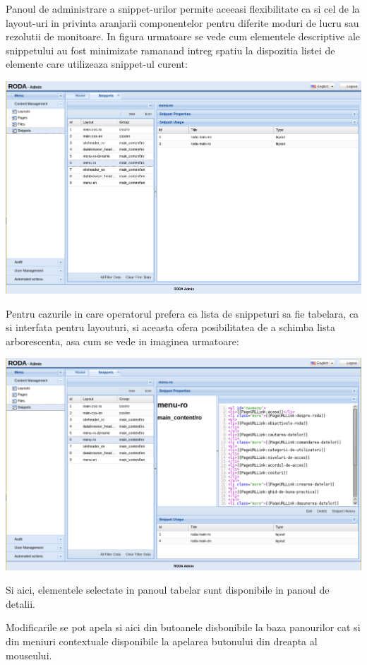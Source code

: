 Panoul de administrare a snippet-urilor permite aceeasi flexibilitate
ca si cel de la layout-uri in privinta aranjarii componentelor pentru
diferite moduri de lucru sau rezolutii de monitoare. In figura urmatoare
se vede cum elementele descriptive ale snippetului au fost minimizate
ramanand intreg spatiu la dispozitia listei de elemente care utilizeaza
snippet-ul curent:

\includegraphics[width=15cm]{cms/backend/snippet/snippet5}

Pentru cazurile in care operatorul prefera ca lista de snippeturi
sa fie tabelara, ca si interfata pentru layouturi, si aceasta ofera
posibilitatea de a schimba lista arborescenta, asa cum se vede in
imaginea urmatoare:

\includegraphics[width=15cm]{cms/backend/snippet/snippet6}

Si aici, elementele selectate in panoul tabelar sunt disponibile in
panoul de detalii. 

Modificarile se pot apela si aici din butoanele disbonibile la baza
panourilor cat si din meniuri contextuale disponibile la apelarea
butonului din dreapta al mouseului. 

